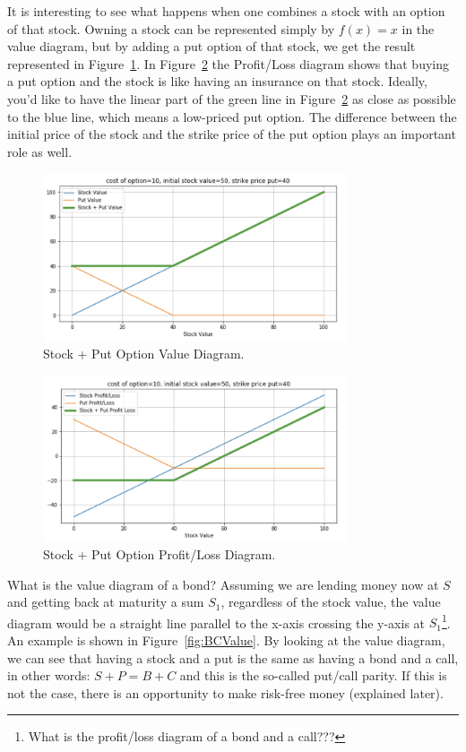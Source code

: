 It is interesting to see what happens when one combines a stock with an option of that stock. Owning a stock can be represented simply by $f(x) = x$ in the value diagram, but by adding a put option of that stock, we get the result represented in Figure~\ref{fig:SPValue}. In Figure~\ref{fig:SPPL} the Profit/Loss diagram shows that buying a put option and the stock is like having an insurance on that stock. Ideally, you'd like to have the linear part of the green line in Figure~\ref{fig:SPPL} as close as possible to the blue line, which means a low-priced put option. The difference between the initial price of the stock and the strike price of the put option plays an important role as well.

\begin{figure}[h!]
\centering
\includegraphics[width=0.8\textwidth]{images/diagrams2.png}
\caption{Stock + Put Option Value Diagram.}
\label{fig:SPValue}
\end{figure}

\begin{figure}[h!]
\centering
\includegraphics[width=0.8\textwidth]{images/diagrams3.png}
\caption{Stock + Put Option Profit/Loss Diagram.}
\label{fig:SPPL}
\end{figure}

What is the value diagram of a bond? Assuming we are lending money now at $S$ and getting back at maturity a sum $S_1$, regardless of the stock value, the value diagram would be a straight line parallel to the x-axis crossing the y-axis at $S_1$\footnote{What is the profit/loss diagram of a bond and a call???}. An example is shown in Figure~\ref{fig:BCValue}.
By looking at the value diagram, we can see that having a stock and a put is the same as having a bond and a call, in other words: $S + P = B + C$ and this is the so-called put/call parity. If this is not the case, there is an opportunity to make risk-free money (explained later).

